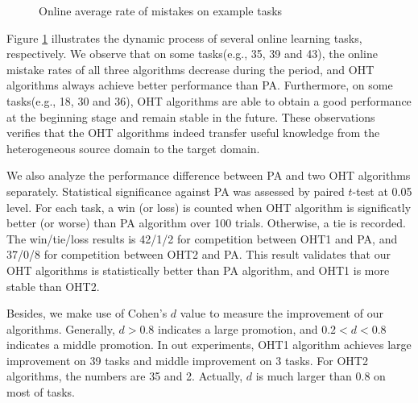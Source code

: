 \documentclass[letterpaper]{article}
\begin{document}
\begin{figure}[!htb]
\begin{center}
{  }
  \caption{Online average rate of mistakes on example tasks}
  \label{Online average rate of mistakes on example tasks}
\end{center}
\end{figure}

Figure \ref{Online average rate of mistakes on example tasks} illustrates the dynamic process of several online learning tasks, respectively.
We observe that on some tasks(e.g., 35, 39 and 43), the online mistake rates of all three algorithms decrease during the period, and OHT algorithms always achieve better performance than PA.
Furthermore, on some tasks(e.g., 18, 30 and 36), OHT algorithms are able to obtain a good performance at the beginning stage and remain stable in the future.
These observations verifies that the OHT algorithms indeed transfer useful knowledge from the heterogeneous source domain to the target domain. 

We also analyze the performance difference between PA and two OHT algorithms separately.
Statistical significance against PA was assessed by paired $t$-test at 0.05 level.
For each task, a win (or loss) is counted when OHT algorithm is significatly better (or worse) than PA algorithm over 100 trials.
Otherwise, a tie is recorded.
The win/tie/loss results is 42/1/2 for competition between OHT1 and PA, and 37/0/8 for competition between  OHT2 and PA.
This result validates that our OHT algorithms is statistically better than PA algorithm, and OHT1 is more stable than OHT2.

Besides, we make use of Cohen's $d$ value to measure the improvement of our algorithms.
Generally, $d > 0.8$ indicates a large promotion, and $0.2 < d < 0.8$ indicates a middle promotion.
In out experiments, OHT1 algorithm achieves large improvement on 39 tasks and middle improvement on 3 tasks.
For OHT2 algorithms, the numbers are 35 and 2.
Actually, $d$ is much larger than $0.8$ on most of tasks.
\end{document}
